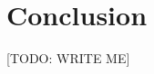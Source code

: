 \documentclass{article} %
\begin{document}



\section{Conclusion}
\label{sec:conclusion}

[TODO: WRITE ME]


\end{document}
